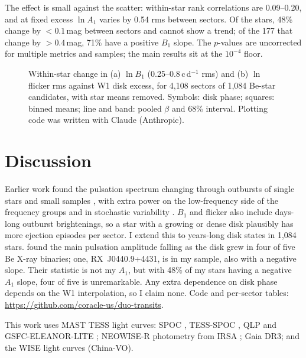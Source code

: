 \documentclass{aastex701}
\begin{document}
The effect is small against the scatter: within-star rank correlations are 0.09--0.20, and at
fixed excess $\ln A_1$ varies by 0.54 rms between sectors. Of the stars,
48\% change by $<0.1$\,mag between sectors and cannot show a trend; of the 177 that change
by $>0.4$\,mag, 71\% have a positive $B_1$ slope. The $p$-values are uncorrected for
multiple metrics and samples; the main results sit at the $10^{-4}$ floor.

\begin{figure}[ht!]
\caption{Within-star change in (a) $\ln B_1$ (0.25--0.8\,c\,d$^{-1}$ rms) and (b) $\ln$ flicker rms
against W1 disk excess, for 4,108 sectors of 1,084 Be-star candidates, with star means
removed. Symbols: disk phase; squares: binned means; line and band: pooled
$\beta$ and 68\% interval. Plotting code was written with Claude
(Anthropic).\label{fig:beta}}
\end{figure}

\section{Discussion}

Earlier work found the pulsation spectrum changing through outbursts of single stars and small
samples \citep{Huat2009,Semaan2018}, with extra power on the low-frequency side of the frequency
groups and in stochastic variability \citep{LabadieBartz2022,LabadieBartz2025}. $B_1$ and flicker
also include days-long outburst brightenings, so a star with a growing or dense disk
plausibly has more ejection episodes per sector. I extend this to years-long disk states in
1,084 stars. \citet{Niwano2024} found the main pulsation amplitude falling as the disk grew in four
of five Be X-ray binaries; one, RX~J0440.9+4431, is in my sample, also with a negative slope.
Their statistic is not my $A_1$, but with 48\% of my stars having a negative $A_1$ slope, four
of five is unremarkable. Any extra dependence on disk phase
depends on the W1 interpolation, so I claim none. Code and per-sector tables: \url{https://github.com/coracle-us/duo-transits}.

\begin{acknowledgments}
This work uses MAST TESS light curves: SPOC
, TESS-SPOC
, QLP
 and GSFC-ELEANOR-LITE
; NEOWISE-R
photometry from IRSA ;
Gaia DR3; and the \citet{Jia2026} WISE light curves (China-VO).
\end{acknowledgments}
\end{document}
